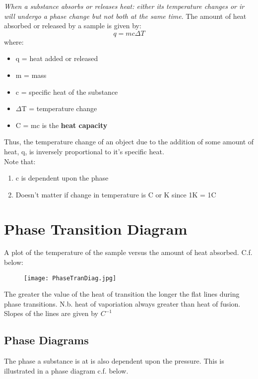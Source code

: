 \documentclass[../GChemReview.tex]{subfiles}
\begin{document}
	\emph{When a substance absorbs or releases heat: either its temperature changes \emph{or} ir will undergo a phase change \emph{but not both at the same time}}. The amount of heat absorbed or released by a sample is given by:
	\begin{equation}
		q = mc\Delta T
	\end{equation}
	where:
	\begin{itemize}
		\item q = heat added or released
		\item m = mass
		\item c = specific heat of the substance
		\item $ \Delta $T = temperature change
		\item C = mc is the \textbf{heat capacity}
	\end{itemize}
	Thus, the temperature change of an object due to the addition of some amount of heat, q, is inversely proportional to it's specific heat.\\
	Note that:
	\begin{enumerate}
		\item c is dependent upon the phase
		\item Doesn't matter if change in temperature is C or K since 1K = 1C 
	\end{enumerate}
	
	\section{Phase Transition Diagram}
	
	A plot of the temperature of the sample versus the amount of heat absorbed. C.f. below:
	
	\begin{figure}[h]
		\centering
		\texttt{[image: PhaseTranDiag.jpg]}
	\end{figure}
	
	The greater the value of the heat of transition the longer the flat lines during phase transitions. N.b. heat of vaporiation always greater than heat of fusion. Slopes of the lines are given by $ C^{-1} $
	
	\subsection{Phase Diagrams}
	
	The phase a substance is at is also dependent upon the pressure. This is illustrated in a phase diagram c.f. below.
	
\end{document}
